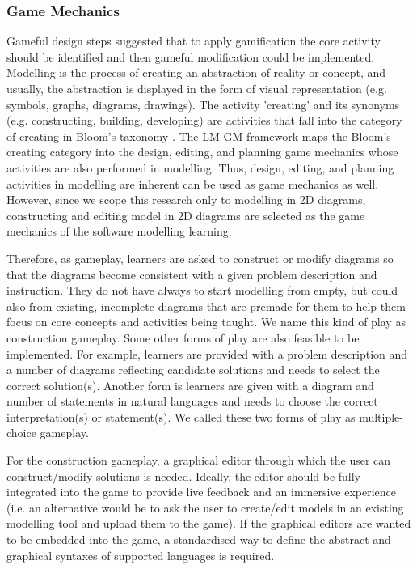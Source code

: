 \documentclass[conference]{IEEEtran}
\begin{document}
\subsubsection{Game Mechanics} 
Gameful design steps \cite{deterding2015lens} suggested that to apply gamification the core activity should be identified and then gameful modification could be implemented. Modelling is the process of creating an abstraction of reality or concept, and usually, the abstraction is displayed in the form of visual representation (e.g. symbols, graphs, diagrams, drawings). The activity 'creating' and its synonyms (e.g. constructing, building, developing) are activities that fall into the category of creating in Bloom's taxonomy \cite{krathwohl2002revision}. The LM-GM framework \cite{arnab2015mapping} maps the Bloom's creating category into the design, editing, and planning game mechanics whose activities are also performed in modelling. Thus, design, editing, and planning activities in modelling are inherent can be used as game mechanics as well. However, since we scope this research only to modelling in 2D diagrams, constructing and editing model in 2D diagrams are selected as the game mechanics of the software modelling learning.

Therefore, as gameplay, learners are asked to construct or modify diagrams so that the diagrams become consistent with a given problem description and instruction. They do not have always to start modelling from empty, but could also from existing, incomplete diagrams that are premade for them to help them focus on core concepts and activities being taught\cite{deterding2015lens}. We name this kind of play as construction gameplay. Some other forms of play are also feasible to be implemented. For example, learners are provided with a problem description and a number of diagrams reflecting candidate solutions and needs to select the correct solution(s). Another form is learners are given with a diagram and number of statements in natural languages and needs to choose the correct interpretation(s) or statement(s). We called these two forms of play as multiple-choice gameplay. 

For the construction gameplay, a graphical editor through which the user can construct/modify solutions is needed. Ideally, the editor should be fully integrated into the game to provide live feedback and an immersive experience (i.e. an alternative would be to ask the user to create/edit models in an existing modelling tool and upload them to the game). If the graphical editors are wanted to be embedded into the game, a standardised way to define the abstract and graphical syntaxes of supported languages is required. 
\end{document}
